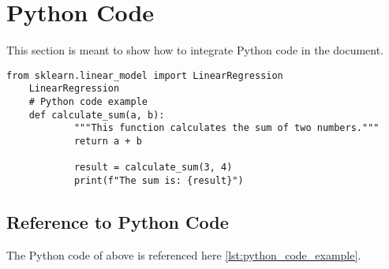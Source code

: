 \newpage

\section{Python Code}\label{ch3:python_code}
This section is meant to show how to integrate Python code in the document.

\begin{mdframed}
	\begin{lstlisting}[caption=Python Example, label=lst:python_code_example]
	from sklearn.linear_model import LinearRegression
	LinearRegression 
	# Python code example
	def calculate_sum(a, b):
			"""This function calculates the sum of two numbers."""
			return a + b
			
			result = calculate_sum(3, 4)
			print(f"The sum is: {result}")
	\end{lstlisting}
\end{mdframed}

\subsection{Reference to Python Code}\label{subsec:reference_python_code}
\noindent The Python code of above is referenced here \cref{lst:python_code_example}.